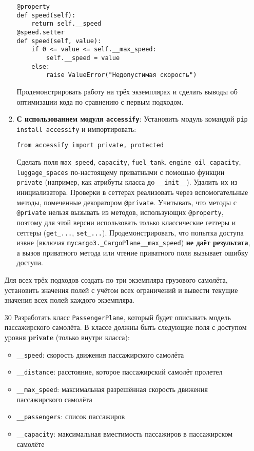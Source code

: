 \begin{enumerate}
\begin{enumerate}
\begin{verbatim}
@property
def speed(self):
    return self.__speed
@speed.setter
def speed(self, value):
    if 0 <= value <= self.__max_speed:
        self.__speed = value
    else:
        raise ValueError("Недопустимая скорость")
    \end{verbatim}  
    Продемонстрировать работу на трёх экземплярах и сделать выводы об оптимизации кода по сравнению с первым подходом.
    \item \textbf{С использованием модуля \texttt{accessify}}:  
    Установить модуль командой \texttt{pip install accessify} и импортировать:  
    \begin{verbatim}
from accessify import private, protected
    \end{verbatim}  
    Сделать поля \texttt{max\_speed}, \texttt{capacity}, \texttt{fuel\_tank}, \texttt{engine\_oil\_capacity}, \texttt{luggage\_spaces} по-настоящему приватными с помощью функции \texttt{private} (например, как атрибуты класса до \texttt{\_\_init\_\_}). Удалить их из инициализатора.  
    Проверки в сеттерах реализовать через вспомогательные методы, помеченные декоратором \texttt{@private}.  
    Учитывать, что методы с \texttt{@private} нельзя вызывать из методов, использующих \texttt{@property}, поэтому для этой версии использовать только классические геттеры и сеттеры (\texttt{get\_...}, \texttt{set\_...}).  
    Продемонстрировать, что попытка доступа извне (включая \texttt{mycargo3.\_CargoPlane\_\_max\_speed}) \textbf{не даёт результата}, а вызов приватного метода или чтение приватного поля вызывает ошибку доступа.
\end{enumerate}
Для всех трёх подходов создать по три экземпляра грузового самолёта, установить значения полей с учётом всех ограничений и вывести текущие значения всех полей каждого экземпляра.
\item[30] Разработать класс \texttt{PassengerPlane}, который будет описывать модель пассажирского самолёта. В классе должны быть следующие поля с доступом уровня \textbf{private} (только внутри класса):
\begin{itemize}
    \item \texttt{\_\_speed}: скорость движения пассажирского самолёта  
    \item \texttt{\_\_distance}: расстояние, которое пассажирский самолёт пролетел  
    \item \texttt{\_\_max\_speed}: максимальная разрешённая скорость движения пассажирского самолёта  
    \item \texttt{\_\_passengers}: список пассажиров  
    \item \texttt{\_\_capacity}: максимальная вместимость пассажиров в пассажирском самолёте  

\end{itemize}
\end{enumerate}
